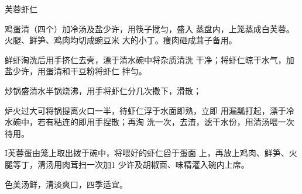 \begin{recipe}{芙蓉虾仁}

\ingredients


\cooking

\step 鸡蛋清（四个）加冷汤及盐少许，用筷子搅匀，盛入 蒸盘内，上笼蒸成白芙蓉。火腿、鲜笋、鸡肉均切成豌豆米 大的小丁。痩肉砸成茸子备用。

\step 鲜虾淘洗后用手挤仁去壳，漂于清水碗中将杂质清洗 干净；将虾仁晾干水气，加盐少许，用蛋清和干豆粉将虾仁 拌匀。

\step 炒锅盛清水半锅烧沸，用手将虾仁分几次撒下，滑散；

炉火过大可将锅提离火口一半，待虾仁浮于水面即熟，立即 用漏瓢打起，漂于冷水碗中，若有粘连的即用手捏散；再淘 洗一次，去渣，滤干水份，用清汤喂一次待用。

I芙蓉蛋由笼上取出拨于碗中，将喂好的虾仁舀于蛋面 上，再放上鸡肉、鲜笋、火腿等丁，清汤用肉茸扫一次加1 少许及胡椒面、味精灌入碗内上席。

\notes

色美汤鲜，清淡爽口，四季适宜。

\end{recipe}

